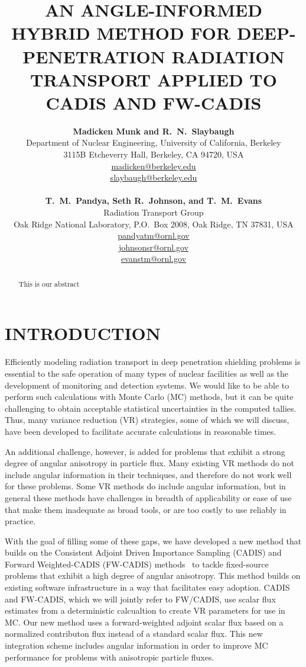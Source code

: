 \documentclass[12pt]{article}
\title{AN ANGLE-INFORMED HYBRID METHOD FOR DEEP-PENETRATION RADIATION TRANSPORT APPLIED TO CADIS AND FW-CADIS}
\author{ 
  \textbf{Madicken Munk and R.~N.~Slaybaugh} \\
  Department of Nuclear Engineering, University of California, Berkeley \\
  3115B Etcheverry Hall, Berkeley, CA 94720, USA\\
  \href{mailto:madicken@berkeley.edu}{madicken@berkeley.edu}\\
  \href{mailto:slaybaugh@berkeley.edu}{slaybaugh@berkeley.edu}\\
  \\
  \textbf{T.~M.~Pandya, Seth R.~Johnson, and T.~M.~Evans}\\
  Radiation Transport Group\\
  Oak Ridge National Laboratory, P.O.\ Box 2008, Oak Ridge, TN 37831, USA\\
  \href{mailto:pandyatm@ornl.gov}{pandyatm@ornl.gov}\\
  \href{mailto:johnsonsr@ornl.gov}{johnsonsr@ornl.gov}\\
  \href{mailto:evanstm@ornl.gov}{evanstm@ornl.gov}
  }
\begin{document}


\maketitle

\begin{abstract}
This is our abstract
\end{abstract}


%
\section{INTRODUCTION}
\label{sect::intro}

Efficiently modeling radiation transport in deep penetration shielding problems is essential to the safe operation of many types of nuclear facilities as well as the development of monitoring and detection systems. We would like to be able to perform such calculations with Monte Carlo (MC) methods, but it can be quite challenging to obtain acceptable statistical uncertainties in the computed tallies. Thus, many variance reduction (VR) strategies, some of which we will discuss, have been developed to facilitate accurate calculations in reasonable times. 

An additional challenge, however, is added for problems that exhibit a strong degree of angular anisotropy in particle flux. 
Many existing VR methods do not include angular information in their techniques, and therefore do not work well for these problems.  
Some VR methods do include angular information, but in general these methods have challenges in breadth of applicability or ease of use that make them inadequate as broad tools, or are too costly to use reliably in practice.

With the goal of filling some of these gaps, we have developed a new method that builds on the Consistent Adjoint Driven Importance Sampling (CADIS) and Forward Weighted-CADIS (FW-CADIS) methods~\cite{wagner_forward-weighted_2007} to tackle fixed-source problems that exhibit a high degree of angular anisotropy. 
This method builds on existing software infrastructure in a way that facilitates easy adoption.
CADIS and FW-CADIS, which we will jointly refer to FW/CADIS, use scalar flux estimates from a deterministic calcualtion to create VR parameters for use in MC.
Our new method uses a forward-weighted adjoint scalar flux based on a normalized contributon flux instead of a standard scalar flux.
This new integration scheme includes angular information in order to improve MC performance for problems with anisotropic particle fluxes.
\end{document}
